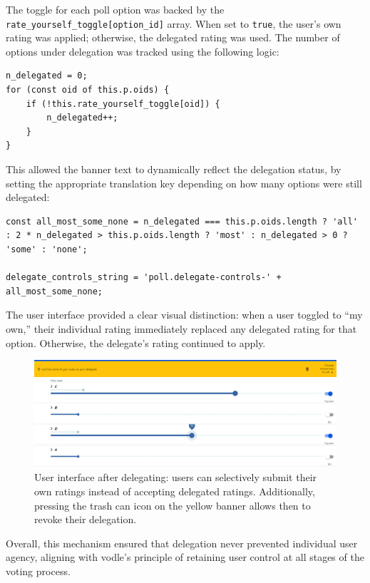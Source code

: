 The toggle for each poll option was backed by the \texttt{rate\_yourself\_toggle[option\_id]} array. When set to \texttt{true}, the user's own rating was applied; otherwise, the delegated rating was used. The number of options under delegation was tracked using the following logic:

\begin{verbatim}
n_delegated = 0;
for (const oid of this.p.oids) {
    if (!this.rate_yourself_toggle[oid]) {
        n_delegated++;
    }
}
\end{verbatim}

This allowed the banner text to dynamically reflect the delegation status, by setting the appropriate translation key depending on how many options were still delegated:

\begin{verbatim}
const all_most_some_none = n_delegated === this.p.oids.length ? 'all' : 2 * n_delegated > this.p.oids.length ? 'most' : n_delegated > 0 ? 'some' : 'none';

delegate_controls_string = 'poll.delegate-controls-' + all_most_some_none;
\end{verbatim}

The user interface provided a clear visual distinction: when a user toggled to ``my own,'' their individual rating immediately replaced any delegated rating for that option. Otherwise, the delegate's rating continued to apply.

\begin{figure}[H]
    \centering
    \includegraphics[width=\linewidth]{../common/vodle_screenshots/override.png}
    \caption{User interface after delegating: users can selectively submit their own ratings instead of accepting delegated ratings. Additionally, pressing the trash can icon on the yellow banner allows then to revoke their delegation.}
    \label{fig:vote_override}
\end{figure}

Overall, this mechanism ensured that delegation never prevented individual user agency, aligning with vodle's principle of retaining user control at all stages of the voting process.


